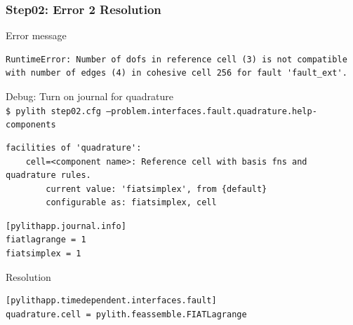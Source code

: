 \documentclass{beamer}
\newcommand{\cmd}[1]{{\tiny\tt \color{ltred}#1}}
\newcommand{\errlabel}[1]{{\small \color{blue}#1}}
\newcommand{\debuginfo}[1]{{\small \color{green}#1}}
\begin{document}
\begin{frame}[fragile]
  \frametitle{Step02: Error 2 Resolution}

\errlabel{Error message}
\begin{lstlisting}
RuntimeError: Number of dofs in reference cell (3) is not compatible
with number of edges (4) in cohesive cell 256 for fault 'fault_ext'.
\end{lstlisting}\pause
\errlabel{Debug:} \debuginfo{Turn on journal for quadrature}\\
\cmd{\$ pylith step02.cfg --problem.interfaces.fault.quadrature.help-components}
\begin{lstlisting}
facilities of 'quadrature':
    cell=<component name>: Reference cell with basis fns and quadrature rules.
        current value: 'fiatsimplex', from {default}
        configurable as: fiatsimplex, cell
\end{lstlisting}\pause
\begin{lstlisting}
[pylithapp.journal.info]
fiatlagrange = 1
fiatsimplex = 1
\end{lstlisting}
\errlabel{Resolution}
\begin{lstlisting}
[pylithapp.timedependent.interfaces.fault]
quadrature.cell = pylith.feassemble.FIATLagrange
\end{lstlisting}

\end{frame}
\end{document}
